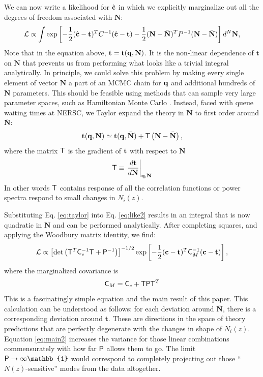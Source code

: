 \documentclass[a4paper,11pt]{article}
\newcommand{\vt}{\mathbf{t}}
\newcommand{\vN}{\mathbf{N}}
\begin{document}
      We can now write a likelihood for $\hat{\bf c}$ in which we explicitly marginalize out all the degrees of freedom associated with $\vN$:
      \begin{equation}
        \mathcal{L} \propto  \int \exp\left [-\frac{1}{2} (\hat{\bf c}-\vt)^T C^{-1} (\hat{\bf c}-\vt) -\frac{1}{2} (\vN - \bar{\vN})^T P^{-1} (\vN -\bar{\vN}) \right]  d^N\vN, \label{eq:like2}
      \end{equation}
      Note that in the equation above, $\vt=\vt({\bf q},\vN)$. It is the non-linear dependence of $\vt$ on $\vN$ that prevents us from performing what looks like a trivial integral analytically. In principle, we could solve this problem by making every single element of vector $\vN$ a part of an MCMC chain for ${\bf q}$ and additional hundreds of $\vN$ parameters. This should be feasible using methods that can sample very large parameter spaces, such as Hamiltonian Monte Carlo \cite{1987PhLB..195..216D}. Instead, faced with queue waiting times at NERSC, we Taylor expand the theory in $\vN$ to first order around $\bar{\vN}$:
      \begin{equation}
        \vt({\bf q},\vN) \simeq \vt({\bf q},\bar{\vN}) + {\sf T} \left(\vN - \bar{\vN} \right), \label{eq:taylor}
      \end{equation}
      where the matrix ${\sf T}$ is the gradient of ${\bf t}$ with respect to $\vN$
      \begin{equation}
        {\sf T}\equiv \left.\frac{d{\bf t}}{d\vN}\right|_{{\bf q},\bar{\vN}}
        \label{eq:Tmat}
      \end{equation}
      In other words ${\sf T}$ contains response of all the correlation functions or power spectra respond to small changes in $N_i(z)$.

      Substituting Eq. \ref{eq:taylor} into Eq. \ref{eq:like2} results in an integral that is now quadratic in $\vN$ and can be performed analytically. After completing squares, and applying the Woodbury matrix identity, we find:
      \begin{equation}
        \mathcal{L} \propto \left[{\rm det}\left({\sf T}^T {\sf C}_c^{-1} {\sf T} +{\sf P}^{-1}\right)\right]^{-1/2} \exp\left [-\frac{1}{2} ({\bf c}-\vt)^T {\sf C}_M^{-1} ({\bf c}-\vt) \right], \label{eq:main1}
      \end{equation}
      where the  marginalized covariance is
      \begin{equation}
        {\sf C}_M = {\sf C}_c + {\sf T}{\sf P}{\sf T}^T \label{eq:main2}
      \end{equation}
      This is a fascinatingly simple equation and the main result of this paper. This calculation can be understood as follows: for each deviation around $\bar{\vN}$, there is a corresponding deviation around $\vt$. These are directions in the space of theory predictions that are perfectly degenerate with the changes in shape of $N_i(z)$.  Equation \ref{eq:main2}  increases the variance for those linear combinations commensurately with how far ${\sf P}$ allows them to go. The limit ${\sf P}\rightarrow\infty\mathbb{1}$ would correspond to completely projecting out those ``$N(z)$-sensitive'' modes from the data altogether. 
\end{document}
